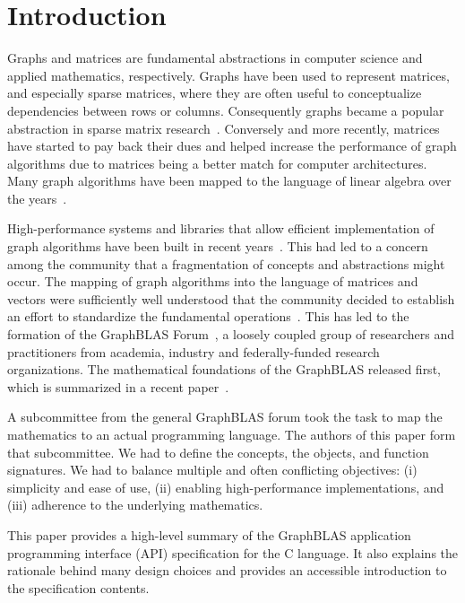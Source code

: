 \section{Introduction}
\label{sec:intro}
Graphs and matrices are fundamental abstractions in computer science and applied mathematics, respectively. Graphs have been used to represent matrices, and especially sparse matrices, where they are often useful to conceptualize dependencies between rows or columns. Consequently graphs became a popular abstraction in sparse matrix research~\cite{george2012graph}. Conversely and more recently, matrices have started to pay back their dues and helped increase the performance of graph algorithms due to matrices being a better match for computer architectures. Many graph algorithms have been mapped to the language of linear algebra over the years~\cite{kepner2011graph}.

High-performance systems and libraries that allow efficient implementation of graph algorithms have been built in recent years~\cite{combblas, gadepally2015graphulo, gpi2016, sundaram2015graphmat}. This had led to a concern among the community that a fragmentation of concepts and abstractions might occur. The mapping of graph algorithms into the language of matrices and vectors were sufficiently well understood that the community decided to establish an effort to standardize the fundamental operations~\cite{hpec13}. This has led to the formation of the GraphBLAS Forum~\cite{graphblas_web}, a loosely coupled group 
of researchers and practitioners from academia, industry and federally-funded research organizations. The mathematical foundations of the GraphBLAS released first, which is summarized
in a recent paper~\cite{mathgraphblas16}.

A subcommittee from the general GraphBLAS forum took the task to map the mathematics to an actual programming language. The authors of this paper form that subcommittee. We had to define the concepts, the objects, and function signatures. We had to balance multiple and often conflicting objectives: (i) simplicity and ease of use, (ii) enabling high-performance implementations, and (iii) adherence to the underlying mathematics. 

This paper provides a high-level summary of the GraphBLAS application programming interface (API) specification for the C language. It also explains the rationale behind
many design choices and provides an accessible introduction to the specification contents.  